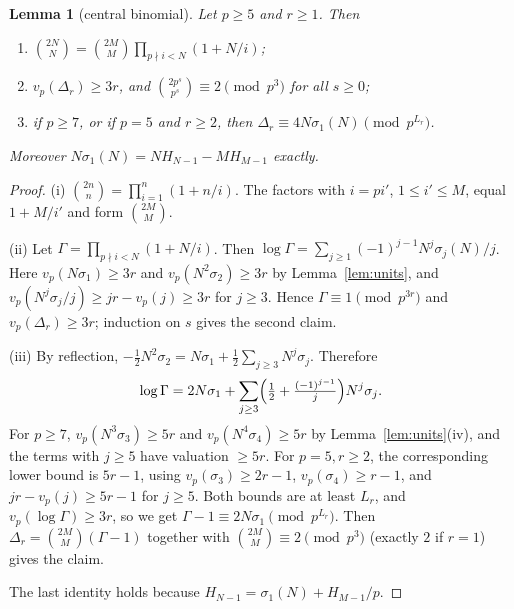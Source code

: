 \documentclass[11pt]{amsart}
\newtheorem{lemma}[theorem]{Lemma}
\theoremstyle{definition}
\theoremstyle{remark}
\newcommand{\vp}{v_p}
\begin{document}
\begin{lemma}[central binomial]\label{lem:cb}
Let $p\ge5$ and $r\ge1$. Then
\begin{enumerate}
\item[(i)] $\binom{2N}N=\binom{2M}M\prod_{p\nmid i<N}(1+N/i)$;
\item[(ii)] $\vp(\Delta_r)\ge3r$, and $\binom{2p^s}{p^s}\equiv2\pmod{p^3}$ for all $s\ge0$;
\item[(iii)] if $p\ge7$, or if $p=5$ and $r\ge2$, then
$\Delta_r\equiv 4N\sigma_1(N)\pmod{p^{L_r}}$.
\end{enumerate}
Moreover $N\sigma_1(N)=NH_{N-1}-MH_{M-1}$ exactly.
\end{lemma}
\begin{proof}
(i) $\binom{2n}n=\prod_{i=1}^n(1+n/i)$. The factors with $i=pi'$, $1\le i'\le M$, equal
$1+M/i'$ and form $\binom{2M}M$.

(ii) Let $\Gamma=\prod_{p\nmid i<N}(1+N/i)$. Then
$\log\Gamma=\sum_{j\ge1}(-1)^{j-1}N^j\sigma_j(N)/j$. Here $\vp(N\sigma_1)\ge3r$ and
$\vp(N^2\sigma_2)\ge3r$ by Lemma~\ref{lem:units}, and $\vp(N^j\sigma_j/j)\ge jr-\vp(j)\ge 3r$
for $j\ge3$. Hence $\Gamma\equiv1\pmod{p^{3r}}$ and $\vp(\Delta_r)\ge3r$; induction on $s$ gives
the second claim.

(iii) By reflection,
$-\tfrac12N^2\sigma_2=N\sigma_1+\tfrac12\sum_{j\ge3}N^j\sigma_j$. Therefore
\[
\log\Gamma=2N\sigma_1+\sum_{j\ge3}\Bigl(\tfrac12+\tfrac{(-1)^{j-1}}j\Bigr)N^j\sigma_j .
\]
For $p\ge7$, $\vp(N^3\sigma_3)\ge5r$ and $\vp(N^4\sigma_4)\ge5r$ by Lemma~\ref{lem:units}(iv),
and the terms with $j\ge5$ have valuation $\ge 5r$. For $p=5,r\ge2$,
the corresponding lower bound is $5r-1$, using $v_p(\sigma_3)\ge2r-1$,
$v_p(\sigma_4)\ge r-1$, and $jr-v_p(j)\ge5r-1$ for $j\ge5$.
Both bounds are at least $L_r$, and $\vp(\log\Gamma)\ge3r$, so we
get $\Gamma-1\equiv2N\sigma_1\pmod{p^{L_r}}$. Then $\Delta_r=\binom{2M}M(\Gamma-1)$ together
with $\binom{2M}M\equiv2\pmod{p^3}$ (exactly $2$ if $r=1$) gives the claim.

The last identity holds because $H_{N-1}=\sigma_1(N)+H_{M-1}/p$.
\end{proof}
\end{document}
